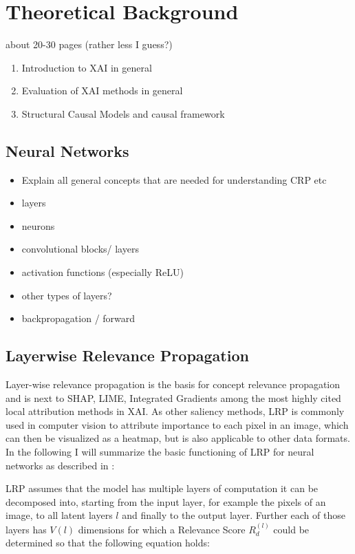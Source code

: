 \chapter{Theoretical Background}\label{chapter:background}

{ \color{red}

    about 20-30 pages (rather less I guess?)

    \begin{enumerate}
        \item Introduction to XAI in general
        \item Evaluation of XAI methods in general
        \item Structural Causal Models and causal framework
    \end{enumerate}
}

\section{Neural Networks}
\begin{itemize}
    \item Explain all general concepts that are needed for understanding CRP etc
    \item layers
    \item neurons
    \item convolutional blocks/ layers
    \item activation functions (especially ReLU)
    \item other types of layers?
    \item backpropagation / forward
\end{itemize}

\section{Layerwise Relevance Propagation}
Layer-wise relevance propagation \cite{Bach2015} is the basis for concept relevance propagation and is next to SHAP, LIME, Integrated Gradients  among the most highly cited local attribution methods in XAI. As other saliency methods, LRP is commonly used in computer vision to attribute importance to each pixel in an image, which can then be visualized as a heatmap, but is also applicable to other data formats. In the following I will summarize the basic functioning of LRP for neural networks as described in \cite{Bach2015}:

LRP assumes that the model has multiple layers of computation it can be decomposed into, starting from the input layer, for example the pixels of an image, to all latent layers $l$ and finally to the output layer. Further each of those layers has $V(l)$ dimensions for which a Relevance Score $R^{(l)}_d$ could be determined so that the following equation holds:

